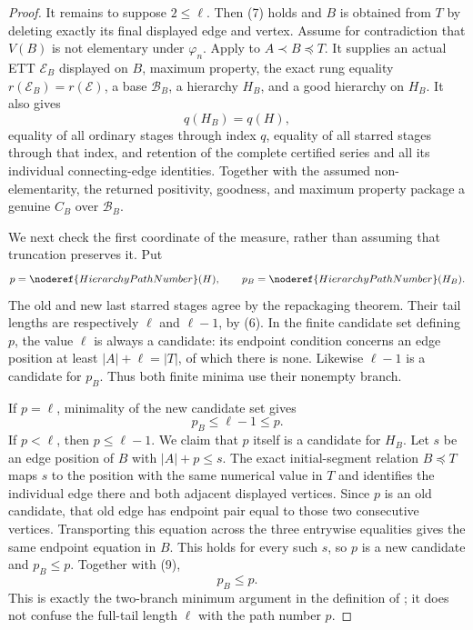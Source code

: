 \begin{proof}
It remains to suppose $2\leq\ell$.  Then (7) holds and $B$ is obtained
from $T$ by deleting exactly its final displayed edge and vertex.  Assume
for contradiction that $V(B)$ is not elementary under $\varphi_n$.
Apply  to $A\prec
B\preccurlyeq T$.  It supplies an actual ETT $\mathcal E_B$ displayed
on $B$, maximum property, the exact rung equality
$r(\mathcal E_B)=r(\mathcal E)$, a base $\mathcal B_B$, a hierarchy
$H_B$, and a good hierarchy on $H_B$.  It also gives
\[
 q(H_B)=q(H),                                                     \tag{8}
\]
equality of all ordinary stages through index $q$, equality of all
starred stages through that index, and retention of the complete
certified series and all its individual connecting-edge identities.
Together with the assumed non-elementarity, the returned positivity,
goodness, and maximum property package a genuine
 $C_B$ over $\mathcal B_B$.

We next check the first coordinate of the measure, rather than assuming
that truncation preserves it.  Put
\[
       p=\noderef{HierarchyPathNumber}(H),\qquad
       p_B=\noderef{HierarchyPathNumber}(H_B).
\]
The old and new last starred stages agree by the repackaging theorem.
Their tail lengths are respectively $\ell$ and $\ell-1$, by (6).
In the finite candidate set defining $p$, the value $\ell$ is always a
candidate: its endpoint condition concerns an edge position at least
$|A|+\ell=|T|$, of which there is none.  Likewise $\ell-1$ is a
candidate for $p_B$.  Thus both finite minima use their nonempty branch.

If $p=\ell$, minimality of the new candidate set gives
\[
                    p_B\leq\ell-1\leq p.                      \tag{9}
\]
If $p<\ell$, then $p\leq\ell-1$.  We claim that $p$ itself is a
candidate for $H_B$.  Let $s$ be an edge position of $B$ with
$|A|+p\leq s$.  The exact initial-segment relation $B\preccurlyeq T$
maps $s$ to the position with the same numerical value in $T$ and
identifies the individual edge there and both adjacent displayed
vertices.  Since $p$ is an old candidate, that old edge has endpoint
pair equal to those two consecutive vertices.  Transporting this
equation across the three entrywise equalities gives the same endpoint
equation in $B$.  This holds for every such $s$, so $p$ is a new
candidate and $p_B\leq p$.  Together with (9),
\[
                    p_B\leq p.                                \tag{10}
\]
This is exactly the two-branch minimum argument in the definition of
; it does not confuse the full-tail length
$\ell$ with the path number $p$.


\end{proof}
